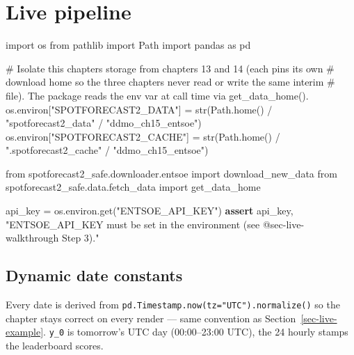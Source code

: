 \documentclass[
  english,
  letterpaper,
]{scrbook}
\newenvironment{Shaded}{\begin{snugshade}}{\end{snugshade}}
\newcommand{\BuiltInTok}[1]{\textcolor[rgb]{0.00,0.23,0.31}{#1}}
\newcommand{\CommentTok}[1]{\textcolor[rgb]{0.37,0.37,0.37}{#1}}
\newcommand{\ControlFlowTok}[1]{\textcolor[rgb]{0.00,0.23,0.31}{\textbf{#1}}}
\newcommand{\ImportTok}[1]{\textcolor[rgb]{0.00,0.46,0.62}{#1}}
\newcommand{\NormalTok}[1]{\textcolor[rgb]{0.00,0.23,0.31}{#1}}
\newcommand{\OperatorTok}[1]{\textcolor[rgb]{0.37,0.37,0.37}{#1}}
\newcommand{\StringTok}[1]{\textcolor[rgb]{0.13,0.47,0.30}{#1}}
\begin{document}
\section{Live pipeline}\label{sec-entsoe-example}

\protect{}\label{entsoe-imports}
\begin{Shaded}
\begin{Highlighting}[]
\ImportTok{import}\NormalTok{ os}
\ImportTok{from}\NormalTok{ pathlib }\ImportTok{import}\NormalTok{ Path}
\ImportTok{import}\NormalTok{ pandas }\ImportTok{as}\NormalTok{ pd}

\CommentTok{\# Isolate this chapter\textquotesingle{}s storage from chapters 13 and 14 (each pins its own}
\CommentTok{\# download home so the three chapters never read or write the same interim}
\CommentTok{\# file). The package reads the env var at call time via get\_data\_home().}
\NormalTok{os.environ[}\StringTok{"SPOTFORECAST2\_DATA"}\NormalTok{]  }\OperatorTok{=} \BuiltInTok{str}\NormalTok{(Path.home() }\OperatorTok{/} \StringTok{"spotforecast2\_data"}  \OperatorTok{/} \StringTok{"ddmo\_ch15\_entsoe"}\NormalTok{)}
\NormalTok{os.environ[}\StringTok{"SPOTFORECAST2\_CACHE"}\NormalTok{] }\OperatorTok{=} \BuiltInTok{str}\NormalTok{(Path.home() }\OperatorTok{/} \StringTok{".spotforecast2\_cache"} \OperatorTok{/} \StringTok{"ddmo\_ch15\_entsoe"}\NormalTok{)}

\ImportTok{from}\NormalTok{ spotforecast2\_safe.downloader.entsoe }\ImportTok{import}\NormalTok{ download\_new\_data}
\ImportTok{from}\NormalTok{ spotforecast2\_safe.data.fetch\_data }\ImportTok{import}\NormalTok{ get\_data\_home}

\NormalTok{api\_key }\OperatorTok{=}\NormalTok{ os.environ.get(}\StringTok{"ENTSOE\_API\_KEY"}\NormalTok{)}
\ControlFlowTok{assert}\NormalTok{ api\_key, }\StringTok{"ENTSOE\_API\_KEY must be set in the environment (see @sec{-}live{-}walkthrough Step 3)."}
\end{Highlighting}
\end{Shaded}

\subsection{Dynamic date constants}\label{dynamic-date-constants-2}

Every date is derived from
\texttt{pd.Timestamp.now(tz="UTC").normalize()} so the chapter stays
correct on every render --- same convention as
Section~\ref{sec-live-example}. \texttt{y\_0} is tomorrow's UTC day
(00:00--23:00 UTC), the 24 hourly stamps the leaderboard scores.
\end{document}
